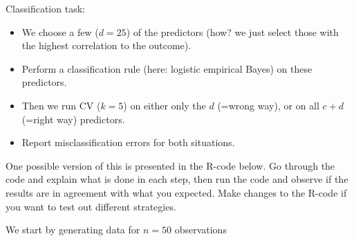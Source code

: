 \documentclass[]{article}
\newenvironment{Shaded}{\begin{snugshade}}{\end{snugshade}}
\newcommand{\KeywordTok}[1]{\textcolor[rgb]{0.13,0.29,0.53}{\textbf{#1}}}
\newcommand{\DataTypeTok}[1]{\textcolor[rgb]{0.13,0.29,0.53}{#1}}
\newcommand{\DecValTok}[1]{\textcolor[rgb]{0.00,0.00,0.81}{#1}}
\newcommand{\StringTok}[1]{\textcolor[rgb]{0.31,0.60,0.02}{#1}}
\newcommand{\CommentTok}[1]{\textcolor[rgb]{0.56,0.35,0.01}{\textit{#1}}}
\newcommand{\OperatorTok}[1]{\textcolor[rgb]{0.81,0.36,0.00}{\textbf{#1}}}
\newcommand{\NormalTok}[1]{#1}
\providecommand{\tightlist}{%
  \setlength{\itemsep}{0pt}\setlength{\parskip}{0pt}}
\begin{document}
Classification task:

\begin{itemize}
\tightlist
\item
  We choose a few (\(d=25\)) of the predictors (how? we just select
  those with the highest correlation to the outcome).
\item
  Perform a classification rule (here: logistic empirical Bayes) on
  these predictors.
\item
  Then we run CV (\(k=5\)) on either only the \(d\) (=wrong way), or on
  all \(c+d\) (=right way) predictors.
\item
  Report misclassification errors for both situations.
\end{itemize}

One possible version of this is presented in the R-code below. Go
through the code and explain what is done in each step, then run the
code and observe if the results are in agreement with what you expected.
Make changes to the R-code if you want to test out different strategies.

We start by generating data for \(n=50\) observations

\begin{Shaded}
\end{Shaded}
\end{document}
